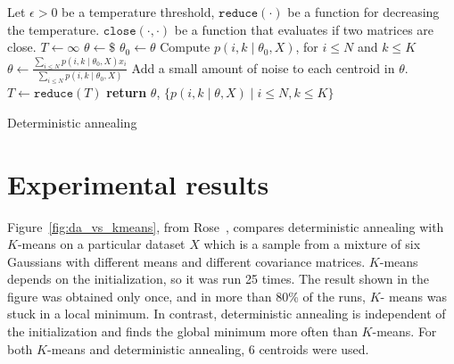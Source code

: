\begin{algorithm}
\begin{algorithmic}[1]
\State Let
\State \qquad $\epsilon > 0$ be a temperature threshold,
\State \qquad $\texttt{reduce}(\cdot)$ be a function for decreasing the temperature.
\State \qquad $\texttt{close}\left(\cdot, \cdot\right)$ be a function that evaluates if two matrices are close.
\State $T \gets \infty$ 
\State $\theta \gets \$$ 
\Repeat
\State $\theta_0 \gets \theta$
\State Compute $p\left(i,k \mid \theta_0, X\right)$, for $i \leq N$ and $k \leq K$
\State $\displaystyle \theta \gets \frac{\sum_{i \leq N} p\left(i,k \mid \theta_0, X\right) x_i}{\sum_{i \leq N} p\left(i,k \mid \theta_0, X\right)}$
\State Add a small amount of noise to each centroid in $\theta$.
\State $T \gets \texttt{reduce}(T)$
\EndWhile
\State \textbf{return} $\theta$, $\{p\left(i,k \mid \theta, X\right) \mid i \leq N, k \leq K\}$
\EndFunction
\end{algorithmic}
\caption{Deterministic annealing}
\label{algo:da_algo_da}
\end{algorithm}

\section{Experimental results}
\label{sec:experiments}

Figure~\ref{fig:da_vs_kmeans}, from Rose~\cite{rose1991deterministic, rose1998deterministic}, compares deterministic annealing with $K$-means
on a particular dataset $X$ which is a sample from a mixture of six Gaussians
with different means and different covariance matrices. $K$-means depends
on the initialization, so it was run 25 times. The result shown in the
figure was obtained only once, and in more than 80\% of the runs, $K$-
means was stuck in a local minimum. In contrast, deterministic annealing
is independent of the initialization and finds the global minimum more
often than $K$-means. For both $K$-means and deterministic annealing, 6
centroids were used.

